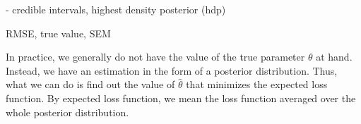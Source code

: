 - credible intervals, highest density posterior (hdp) 


RMSE, true value, SEM 

In practice, we generally do not have the value of the true parameter $\theta$ at hand. Instead, we have an estimation in the form of a posterior distribution. Thus, what we can do is find out the value of $\hat{\theta}$ that minimizes the expected loss function. By expected loss function, we mean the loss function averaged over the whole posterior distribution. 











